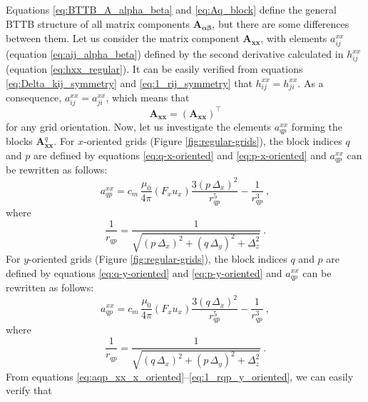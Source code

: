 \documentclass[manuscript]{geophysics}
\begin{document}
Equations \ref{eq:BTTB_A_alpha_beta} and \ref{eq:Aq_block} define the general BTTB
structure of all matrix components $\mathbf{A_{\boldsymbol{\alpha\beta}}}$, but 
there are some differences between them.
Let us consider the matrix component $\mathbf{A}_{\boldsymbol{xx}}$, with elements
$a^{xx}_{ij}$ (equation \ref{eq:aij_alpha_beta}) defined by the second derivative calculated in
$h^{xx}_{ij}$ (equation \ref{eq:hxx_regular}). It can be easily verified from equations
\ref{eq:Delta_kij_symmetry} and \ref{eq:1_rij_symmetry} that $h^{xx}_{ij} = h^{xx}_{ji}$.
As a consequence, $a^{xx}_{ij} = a^{xx}_{ji}$, which means that 
\begin{equation}
	\mathbf{A}_{\boldsymbol{xx}} = \left( \mathbf{A}_{\boldsymbol{xx}} \right)^{\top}
	\label{eq:Axx_symmetry}
\end{equation}
for any grid orientation.
Now, let us investigate the elements $a^{xx}_{qp}$ forming the blocks $\mathbf{A}_{\boldsymbol{xx}}^{q}$.
For $x$-oriented grids (Figure \ref{fig:regular-grids}), the block indices $q$ and $p$ are defined 
by equations \ref{eq:q-x-oriented} and 
\ref{eq:p-x-oriented} and $a^{xx}_{qp}$ can be rewritten as follows:
\begin{equation}
	a^{xx}_{qp} = c_{m} \, \frac{\mu_{0}}{4\pi} 
	\left( F_{x} u_{x} \right) \frac{3 \left( p \, \Delta_{x} \right)^{2}}{r_{qp}^{5}} - 
	\frac{1}{r_{qp}^{3}} \: ,
	\label{eq:aqp_xx_x_oriented}
\end{equation}
where
\begin{equation}
	\frac{1}{r_{qp}} = 
	\frac{1}{\sqrt{\left( p \, \Delta_{x} \right)^{2} + \left( q \, \Delta_{y} \right)^{2} + \Delta_{z}^{2}}} \: .
	\label{eq:1_rqp_x_oriented}
\end{equation}
For $y$-oriented grids (Figure \ref{fig:regular-grids}), the block indices $q$ and $p$ are 
defined by equations \ref{eq:q-y-oriented} and 
\ref{eq:p-y-oriented} and $a^{xx}_{qp}$ can be rewritten as follows:
\begin{equation}
	a^{xx}_{qp} = c_{m} \, \frac{\mu_{0}}{4\pi} 
	\left( F_{x} u_{x} \right) \frac{3 \left( q \, \Delta_{x} \right)^{2}}{r_{qp}^{5}} - 
	\frac{1}{r_{qp}^{3}} \: ,
	\label{eq:aqp_xx_y_oriented}
\end{equation}
where
\begin{equation}
	\frac{1}{r_{qp}} = 
	\frac{1}{\sqrt{\left( q \, \Delta_{x} \right)^{2} + \left( p \, \Delta_{y} \right)^{2} + \Delta_{z}^{2}}} \: .
	\label{eq:1_rqp_y_oriented}
\end{equation}
From equations \ref{eq:aqp_xx_x_oriented}--\ref{eq:1_rqp_y_oriented}, we can easily verify that
\end{document}
